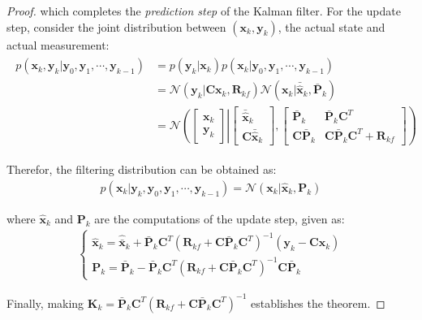 \documentclass[a4paper,11pt]{book}
\numberwithin{figure}{chapter}
\numberwithin{equation}{chapter}
\numberwithin{table}{chapter}
\theoremstyle{definition}
\begin{document}
\begin{proof}
	\noindent which completes the \textit{prediction step} of the Kalman filter. For the update step, consider the joint distribution between $(\bm{x}_k, \bm{y}_k)$, the actual state and actual measurement:
	\begin{align}
	\begin{split}
		p(\bm{x}_k, \bm{y}_{k} | \bm{y}_0, \bm{y}_1, \cdots, \bm{y}_{k-1}) &= p(\bm{y}_k | \bm{x}_{k}) p(\bm{x}_{k} | \bm{y}_0, \bm{y}_1, \cdots, \bm{y}_{k-1}) \\
		&= \mathcal{N}(\bm{y}_k | \bm{C}\bm{x}_{k}, \bm{R}_{kf}) \mathcal{N}(\bm{x}_{k} | \bar{\hat{\bm{x}}}_k, \bar{\bm{P}}_k) \\
		&= \mathcal{N}\left( \begin{bmatrix} \bm{x}_{k} \\ \bm{y}_{k} \end{bmatrix}	 \right| \left.	\begin{bmatrix} \bar{\hat{\bm{x}}}_k \\ \bm{C}\bar{\hat{\bm{x}}}_k \end{bmatrix}, \begin{bmatrix} \bar{\bm{P}}_k & \bar{\bm{P}}_k \bm{C}^T  \\ \bm{C} \bar{\bm{P}}_k & \bm{C} \bar{\bm{P}}_k \bm{C}^T + \bm{R}_{kf} \end{bmatrix}	\right)
	\end{split}
	\end{align}
	
	Therefor, the filtering distribution can be obtained as:
	\begin{align}
		p(\bm{x}_k | \bm{y}_k, \bm{y}_0, \bm{y}_1, \cdots, \bm{y}_{k-1}) = \mathcal{N}(\bm{x}_k | \hat{\bm{x}}_k, \bm{P}_k)
	\end{align}

	\noindent where $\hat{\bm{x}}_k$ and $\bm{P}_k$ are the computations of the update step, given as:
	\begin{align}
	\begin{cases}
		\hat{\bm{x}}_k = \hat{\bar{\bm{x}}}_k + \bar{\bm{P}}_k \bm{C}^T (\bm{R}_{kf} + \bm{C} \bar{\bm{P}}_k \bm{C}^T)^{-1}(\bm{y}_k - \bm{C}\bm{x}_k) \\
		\bm{P}_k = \bar{\bm{P}}_k - \bar{\bm{P}}_k \bm{C}^T (\bm{R}_{kf} + \bm{C} \bar{\bm{P}}_k \bm{C}^T)^{-1} \bm{C} \bar{\bm{P}}_k
	\end{cases}
	\end{align}
	
	Finally, making $\bm{K}_k = \bar{\bm{P}}_k \bm{C}^T (\bm{R}_{kf} + \bm{C} \bar{\bm{P}}_k \bm{C}^T)^{-1}$ establishes the theorem.
\end{proof}
\end{document}
